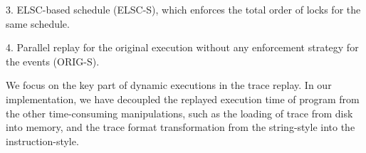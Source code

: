 3. ELSC-based schedule (ELSC-S), which enforces the total order of locks for the same schedule.

4. Parallel replay for the original execution without any enforcement strategy for the events (ORIG-S).


We focus on the key part of dynamic executions in the trace replay. In our implementation, we have decoupled the replayed execution time of program from the other time-consuming manipulations, such as the loading of trace from disk into memory, and the trace format transformation from the string-style into the instruction-style.
\begin{comment}
\begin{figure*}
\setlength{\abovecaptionskip}{10pt}
\setlength{\belowcaptionskip}{-15pt}
\begin{minipage}[t]{0.34\linewidth}
\centering
\setcaptionwidth{2.2in}
\texttt{[image: fig/growth.eps]}
\caption{Growing number of ULCPs with the increasing number of threads}
\label{fig:growth}
\end{minipage}
\begin{minipage}[t]{0.34\linewidth}
\centering
\setcaptionwidth{2.2in}
\texttt{[image: fig/performancefidelity.eps]}
\caption{Performance fidelity comparison among different enforcement strategies for the order }
\label{fig:performancefidelity}
\end{minipage}
\begin{minipage}[t]{0.34\linewidth}
\centering
\setcaptionwidth{2.1in}
\texttt{[image: fig/ISO\_free.eps]}
\caption{The normalized execution time through replaying the traces with and without ULCPs}
\label{fig:overlap}
\end{minipage}
\end{figure*}
\end{comment}
\begin{comment}
\begin{figure}[tbp] \setlength{\abovecaptionskip}{10pt}
\setlength{\belowcaptionskip}{-10pt}
\begin{minipage}{.5\linewidth}
\centering
\texttt{[image: fig/performancefidelity.eps]}
\caption{Performance fidelity comparison between different execution schemes for the replay}
\label{fig:performancefidelity}
\end{minipage}
\begin{minipage}{.5\linewidth}
\centering
\texttt{[image: fig/ISO\_free.eps]}
\caption{The normalized execution time through replaying the traces with and without ULCPs}
\label{fig:overlap}
\end{minipage}
\end{figure}
\end{comment}
